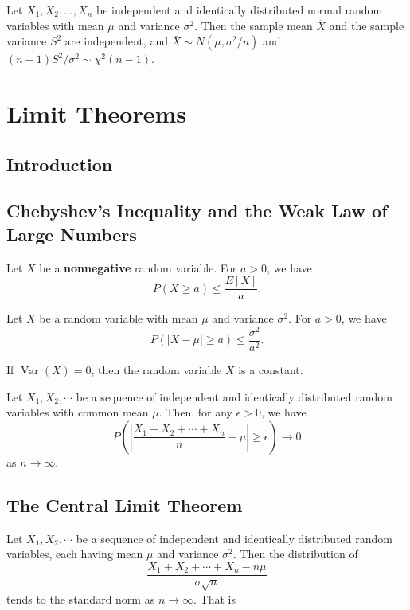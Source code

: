Let \(X_1, X_2, \ldots, X_n\) be independent and identically distributed normal
random variables with mean \(\mu\) and variance \(\sigma^2\). Then the sample
mean \(\overline{X}\) and the sample variance \(S^2\) are independent, and
\(\overline{X}\sim N\left(\mu, \sigma^2/n\right)\) and \((n-1)S^2/\sigma^2
\sim \chi^2(n-1)\).

\section{Limit Theorems}

\subsection{Introduction}

\subsection{Chebyshev's Inequality and the Weak Law of Large Numbers}

 Let \(X\) be a
\textbf{nonnegative} random variable. For \(a > 0\), we have 
\[P(X \geq a)\leq \dfrac{E[X]}{a}.\]

 Let \(X\) be a random variable
with mean \(\mu\) and variance \(\sigma^2\). For \(a > 0\), we have
\[P(|X-\mu| \geq a) \leq \dfrac{\sigma^2}{a^2}.\]

 If \(\operatorname{Var}\left(X\right) = 0\), then the
random variable \(X\) is a constant.

 Let \(X_1, X_2, \cdots\) be
a sequence of independent and identically distributed random variables with
common mean \(\mu\). Then, for any \(\epsilon > 0\), we have
\[P\left(\left|\dfrac{X_1+X_2+\cdots+X_n}{n}-\mu\right|\geq
\epsilon\right)\rightarrow 0\]
as \(n\rightarrow\infty\).

\subsection{The Central Limit Theorem}

Let \(X_1, X_2, \cdots\) be a sequence of independent and identically
distributed random variables, each having mean \(\mu\) and variance
\(\sigma^2\). Then the distribution of 
\[\dfrac{X_1+X_2+\cdots+X_n-n\mu}{\sigma\sqrt{n}}\]
tends to the standard norm as \(n \rightarrow \infty\). That is 

